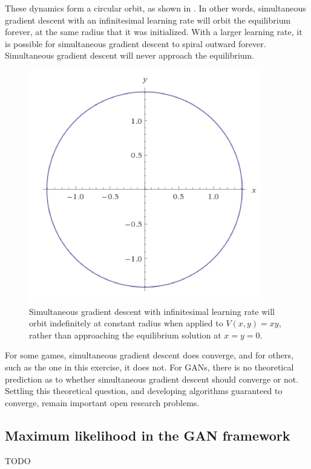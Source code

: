 These dynamics form a circular orbit, as shown in .
In other words, simultaneous gradient descent with an infinitesimal learning rate
will orbit the equilibrium forever, at the same radius that it was initialized.
With a larger learning rate, it is possible for simultaneous gradient descent to
spiral outward forever.
Simultaneous gradient descent will never approach the equilibrium.

\begin{figure}
  \center
  \includegraphics[width=\figwidth]{orbit}
  \caption{Simultaneous gradient descent with infinitesimal learning rate
    will orbit indefinitely at constant radius when applied to $V(x,y) = xy$,
    rather than approaching the equilibrium solution at $x=y=0$.
  }
  \label{fig:orbigt}
\end{figure}

For some games, simultaneous gradient descent does converge, and for others,
such as the one in this exercise, it does not.
For GANs, there is no theoretical prediction as to whether simultaneous
gradient descent should converge or not.
Settling this theoretical question, and developing algorithms guaranteed to
converge, remain important open research problems.

\subsection{Maximum likelihood in the GAN framework}
\label{sec:mle_soln}
TODO

